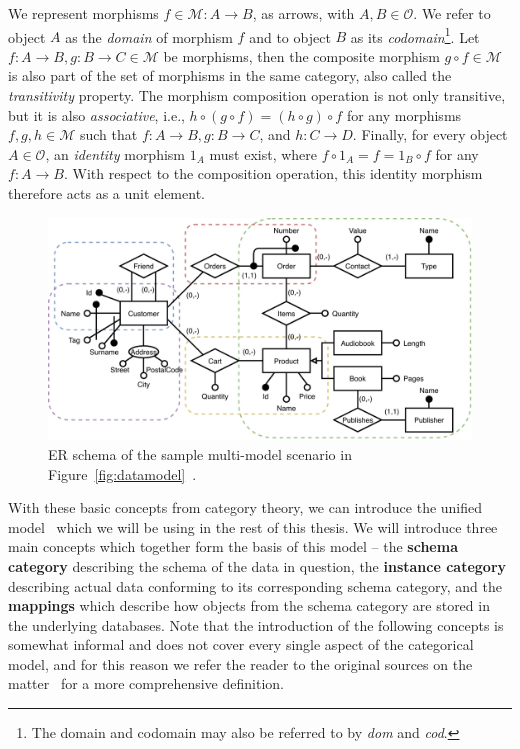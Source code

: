We represent morphisms $f \in \mathcal{M} : A \rightarrow B$, as arrows, with $A, B \in \mathcal{O}$.
We refer to object $A$ as the \textit{domain} of morphism $f$ and to object $B$ as its \textit{codomain}\footnote{The domain and codomain may also be referred to by \textit{dom} and \textit{cod}.}.
Let $f : A \rightarrow B, g : B \rightarrow C \in \mathcal{M}$ be morphisms, then the composite morphism $g \circ f \in \mathcal{M}$ is also part of the set of morphisms in the same category, also called the \textit{transitivity} property.
The morphism composition operation is not only transitive, but it is also \textit{associative}, i.e., $h \circ (g \circ f) = (h \circ g) \circ f$ for any morphisms $f, g, h \in \mathcal{M}$ such that $f : A \rightarrow B, g : B \rightarrow C$, and $h : C \rightarrow D$.
Finally, for every object $A \in \mathcal{O}$, an \textit{identity} morphism $1_A$ must exist, where $f \circ 1_A = f = 1_B \circ f$ for any $f : A \rightarrow B$.
With respect to the composition operation, this identity morphism therefore acts as a unit element.

\begin{figure}[ht]
\centering
\includegraphics[width=\textwidth]{img/fig_schema-er.pdf} 
\caption{ER schema of the sample multi-model scenario in Figure~\ref{fig:datamodel}~\cite{unified_representation}.}
\label{fig:erschema}
\end{figure}

With these basic concepts from category theory, we can introduce the unified model~\cite{one_model}\cite{unified_representation} which we will be using in the rest of this thesis.
We will introduce three main concepts which together form the basis of this model -- the \textbf{schema category} describing the schema of the data in question, the \textbf{instance category} describing actual data conforming to its corresponding schema category, and the \textbf{mappings} which describe how objects from the schema category are stored in the underlying databases.
Note that the introduction of the following concepts is somewhat informal and does not cover every single aspect of the categorical model, and for this reason we refer the reader to the original sources on the matter~\cite{one_model}\cite{unified_representation} for a more comprehensive definition.

